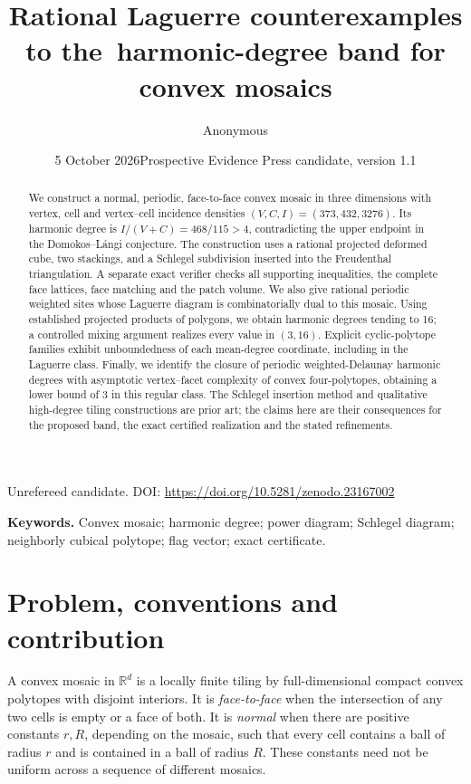 \documentclass[11pt,a4paper]{article}
\title{Rational Laguerre counterexamples to the\ harmonic-degree band for convex mosaics}
\author{Anonymous}
\date{5 October 2026\quad\textnormal{Prospective Evidence Press candidate, version 1.1}}
\theoremstyle{definition}\newtheorem{definition}[theorem]{Definition}
\theoremstyle{remark}\newtheorem{remark}[theorem]{Remark}
\newcommand{\R}{\mathbb R}\newcommand{\Z}{\mathbb Z}\newcommand{\conv}{\operatorname{conv}}
\begin{document}
\maketitle
\begin{center}\small Unrefereed candidate. DOI: \url{https://doi.org/10.5281/zenodo.23167002}\end{center}
\begin{abstract}
We construct a normal, periodic, face-to-face convex mosaic in three dimensions with vertex, cell and vertex--cell incidence densities
\((V,C,I)=(373,432,3276)\). Its harmonic degree is \(I/(V+C)=468/115>4\), contradicting the upper endpoint in the Domokos--L\'angi conjecture. The construction uses a rational projected deformed cube, two stackings, and a Schlegel subdivision inserted into the Freudenthal triangulation. A separate exact verifier checks all supporting inequalities, the complete face lattices, face matching and the patch volume. We also give rational periodic weighted sites whose Laguerre diagram is combinatorially dual to this mosaic. Using established projected products of polygons, we obtain harmonic degrees tending to 16; a controlled mixing argument realizes every value in \((3,16)\). Explicit cyclic-polytope families exhibit unboundedness of each mean-degree coordinate, including in the Laguerre class. Finally, we identify the closure of periodic weighted-Delaunay harmonic degrees with asymptotic vertex--facet complexity of convex four-polytopes, obtaining a lower bound of 3 in this regular class. The Schlegel insertion method and qualitative high-degree tiling constructions are prior art; the claims here are their consequences for the proposed band, the exact certified realization and the stated refinements.
\end{abstract}
\noindent\textbf{Keywords.} Convex mosaic; harmonic degree; power diagram; Schlegel diagram; neighborly cubical polytope; flag vector; exact certificate.

\section{Problem, conventions and contribution}
A convex mosaic in \(\R^d\) is a locally finite tiling by full-dimensional compact convex polytopes with disjoint interiors. It is \emph{face-to-face} when the intersection of any two cells is empty or a face of both. It is \emph{normal} when there are positive constants \(r,R\), depending on the mosaic, such that every cell contains a ball of radius \(r\) and is contained in a ball of radius \(R\). These constants need not be uniform across a sequence of different mosaics.
\end{document}
